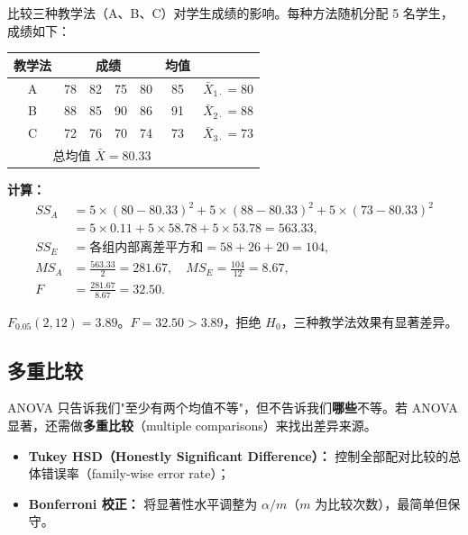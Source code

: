 \begin{example}[三种教学法的比较]
比较三种教学法（A、B、C）对学生成绩的影响。每种方法随机分配 5 名学生，成绩如下：

\begin{center}
\begin{tabular}{c|ccccc|c}
    \toprule
    教学法 & \multicolumn{4}{c}{成绩} & 均值 \\
    \midrule
    A & 78 & 82 & 75 & 80 & 85 & $\bar{X}_{1\cdot} = 80$ \\
    B & 88 & 85 & 90 & 86 & 91 & $\bar{X}_{2\cdot} = 88$ \\
    C & 72 & 76 & 70 & 74 & 73 & $\bar{X}_{3\cdot} = 73$ \\
    \bottomrule
    \multicolumn{6}{c}{总均值 $\bar{X} = 80.33$} \\
\end{tabular}
\end{center}

\textbf{计算：}
\begin{align}
    SS_A &= 5 \times (80-80.33)^2 + 5 \times (88-80.33)^2 + 5 \times (73-80.33)^2 \\
         &= 5 \times 0.11 + 5 \times 58.78 + 5 \times 53.78 = 563.33, \\
    SS_E &= \text{各组内部离差平方和} = 58 + 26 + 20 = 104, \\
    MS_A &= \frac{563.33}{2} = 281.67, \quad
    MS_E = \frac{104}{12} = 8.67, \\
    F    &= \frac{281.67}{8.67} = 32.50.
\end{align}

$F_{0.05}(2, 12) = 3.89$。$F = 32.50 > 3.89$，拒绝 $H_0$，三种教学法效果有显著差异。
\end{example}

\subsection{多重比较}

ANOVA 只告诉我们"至少有两个均值不等"，但不告诉我们\textbf{哪些}不等。若 ANOVA 显著，还需做\textbf{多重比较}（multiple comparisons）来找出差异来源。

\begin{itemize}
    \item \textbf{Tukey HSD（Honestly Significant Difference）：} 控制全部配对比较的总体错误率（family-wise error rate）；
    \item \textbf{Bonferroni 校正：} 将显著性水平调整为 $\alpha / m$（$m$ 为比较次数），最简单但保守。
\end{itemize}

